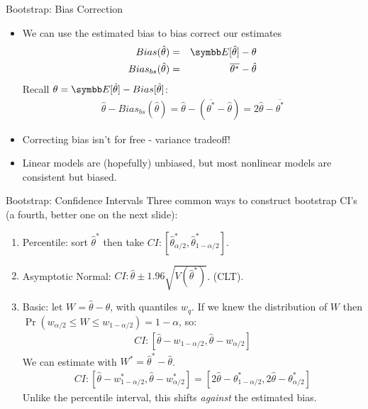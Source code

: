 \documentclass[aspectratio=169,11pt]{beamer}
\begin{document}
\begin{frame}{Bootstrap: Bias Correction}
\begin{itemize}
\item We can use the estimated bias to \alert{bias correct} our estimates
\begin{eqnarray*}
Bias(\hat{\theta}) &=&\E[\hat{\theta}] - \theta \\
Bias_{bs}(\hat{\theta}) &=&\overline{\theta^{*}} -\hat{\theta}
\end{eqnarray*}
Recall $\theta = \E[\hat{\theta}] - Bias[\hat{\theta}]$:
\begin{eqnarray*}
\hat{\theta}- Bias_{bs}(\hat{\theta}) = \hat{\theta}-(\overline{\theta^{*}}-\hat{\theta}) = 2 \hat{\theta} - \overline{\theta^{*}}
\end{eqnarray*}
\item Correcting bias isn't for free - variance tradeoff!
\item Linear models are (hopefully) unbiased, but most nonlinear models are \alert{consistent but biased}.
\end{itemize}

\end{frame}

\begin{frame}{Bootstrap: Confidence Intervals}
Three common ways to construct bootstrap CI's (a fourth, better one on the next slide):
\begin{enumerate}
\item Percentile: sort  $\hat{\theta}^{*}$ then take $CI: [\hat{\theta}^{*}_{\alpha/2},\hat{\theta}^{*}_{1-\alpha/2}]$.
\item Asymptotic Normal:  $CI: \hat{\theta} \pm 1.96 \sqrt{V(\hat{\theta}^{*})}$. (CLT).
\item Basic: let $W= \hat{\theta} -\theta$, with quantiles $w_{q}$. If we knew the distribution of $W$ then $\Pr(w_{\alpha/2} \leq W \leq w_{1-\alpha/2}) = 1-\alpha$, so:
\begin{eqnarray*}
CI: [\hat{\theta} -w_{1-\alpha/2}, \hat{\theta} -w_{\alpha/2}]
\end{eqnarray*}
We can estimate with $W^{*} = \hat{\theta}^{*} - \hat{\theta}$.
\begin{eqnarray*}
CI: [\hat{\theta} -w^*_{1-\alpha/2}, \hat{\theta} -w^*_{\alpha/2}] = [2 \hat{\theta} -\theta^*_{1-\alpha/2}, 2 \hat{\theta} -\theta^*_{\alpha/2}]
\end{eqnarray*}
Unlike the percentile interval, this shifts \emph{against} the estimated bias.
\end{enumerate}

\end{frame}
\end{document}
